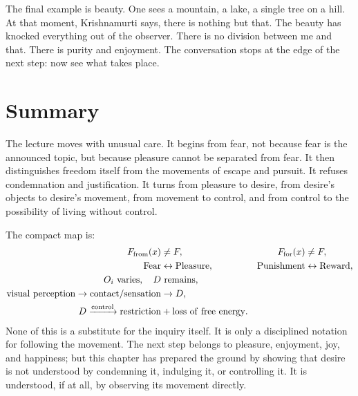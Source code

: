 The final example is beauty. One sees a mountain, a lake, a single tree on a hill. At that moment, Krishnamurti says, there is nothing but that. The beauty has knocked everything out of the observer. There is no division between me and that. There is purity and enjoyment. The conversation stops at the edge of the next step: now see what takes place.

\section{Summary}

The lecture moves with unusual care. It begins from fear, not because fear is the announced topic, but because pleasure cannot be separated from fear. It then distinguishes freedom itself from the movements of escape and pursuit. It refuses condemnation and justification. It turns from pleasure to desire, from desire's objects to desire's movement, from movement to control, and from control to the possibility of living without control.

The compact map is:
\begin{align}
F_{\mathrm{from}}(x) &\neq F,
&
F_{\mathrm{for}}(x) &\neq F,\\
\mathrm{Fear} &\leftrightarrow \mathrm{Pleasure},
&
\mathrm{Punishment} &\leftrightarrow \mathrm{Reward},\\
O_i \ \hbox{varies},\quad D &\ \hbox{remains},\\
\mathrm{visual\ perception}
\to
\mathrm{contact/sensation}
&\to
D,\\
D
\xrightarrow{\mathrm{control}}
\mathrm{restriction}
&+
\mathrm{loss\ of\ free\ energy}.
\end{align}
None of this is a substitute for the inquiry itself. It is only a disciplined notation for following the movement. The next step belongs to pleasure, enjoyment, joy, and happiness; but this chapter has prepared the ground by showing that desire is not understood by condemning it, indulging it, or controlling it. It is understood, if at all, by observing its movement directly.